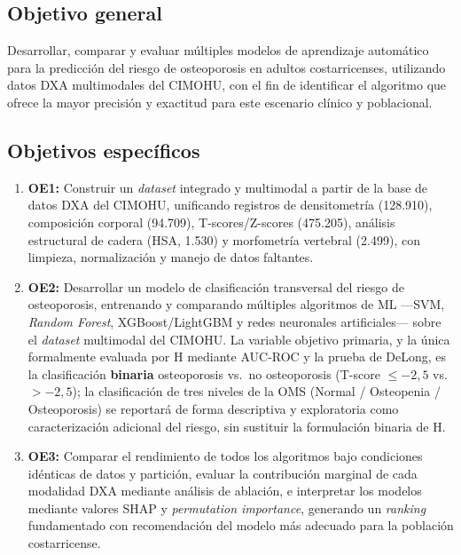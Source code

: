 \documentclass[../tesis.tex]{subfiles}
\begin{document}
\subsection{Objetivo general}

Desarrollar, comparar y evaluar múltiples modelos de aprendizaje automático para la predicción del riesgo de osteoporosis en adultos costarricenses, utilizando datos DXA multimodales del CIMOHU, con el fin de identificar el algoritmo que ofrece la mayor precisión y exactitud para este escenario clínico y poblacional.

\subsection{Objetivos específicos}

\begin{enumerate}
    \item \textbf{OE1:} Construir un \textit{dataset} integrado y multimodal a partir de la base de datos DXA del CIMOHU, unificando registros de densitometría (128.910), composición corporal (94.709), T-scores/Z-scores (475.205), análisis estructural de cadera (HSA, 1.530) y morfometría vertebral (2.499), con limpieza, normalización y manejo de datos faltantes.

    \item \textbf{OE2:} Desarrollar un modelo de clasificación transversal del riesgo de osteoporosis, entrenando y comparando múltiples algoritmos de ML ---SVM, \textit{Random Forest}, XGBoost/LightGBM y redes neuronales artificiales--- sobre el \textit{dataset} multimodal del CIMOHU. La variable objetivo primaria, y la única formalmente evaluada por H mediante AUC-ROC y la prueba de DeLong, es la clasificación \textbf{binaria} osteoporosis vs.\ no osteoporosis (T-score $\leq -2{,}5$ vs.\ $> -2{,}5$); la clasificación de tres niveles de la OMS (Normal / Osteopenia / Osteoporosis) se reportará de forma descriptiva y exploratoria como caracterización adicional del riesgo, sin sustituir la formulación binaria de H.

    \item \textbf{OE3:} Comparar el rendimiento de todos los algoritmos bajo condiciones idénticas de datos y partición, evaluar la contribución marginal de cada modalidad DXA mediante análisis de ablación, e interpretar los modelos mediante valores SHAP y \textit{permutation importance}, generando un \textit{ranking} fundamentado con recomendación del modelo más adecuado para la población costarricense.
\end{enumerate}
\end{document}
